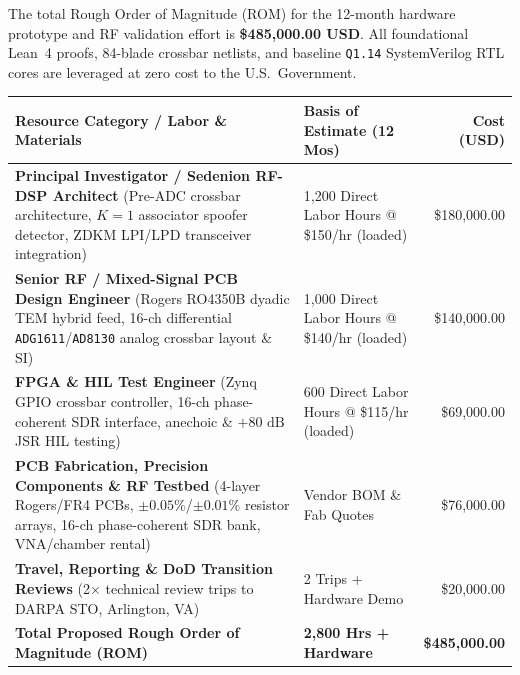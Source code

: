 \documentclass[12pt,letterpaper]{article}
\begin{document}
The total Rough Order of Magnitude (ROM) for the 12-month hardware prototype and RF validation effort is \textbf{\$485,000.00 USD}. All foundational Lean~4 proofs, 84-blade crossbar netlists, and baseline \texttt{Q1.14} SystemVerilog RTL cores are leveraged at zero cost to the U.S.\ Government.

\vspace{4pt}
\begin{tabular}{@{}p{2.9in}p{1.75in}r@{}}
\toprule
\textbf{Resource Category / Labor \& Materials} & \textbf{Basis of Estimate (12 Mos)} & \textbf{Cost (USD)} \\
\midrule
\textbf{Principal Investigator / Sedenion RF-DSP Architect} \newline (Pre-ADC crossbar architecture, $K=1$ associator spoofer detector, ZDKM LPI/LPD transceiver integration) & 1,200 Direct Labor Hours @ \$150/hr (loaded) & \$180,000.00 \\
\addlinespace[3pt]
\textbf{Senior RF / Mixed-Signal PCB Design Engineer} \newline (Rogers RO4350B dyadic TEM hybrid feed, 16-ch differential \texttt{ADG1611}/\texttt{AD8130} analog crossbar layout \& SI) & 1,000 Direct Labor Hours @ \$140/hr (loaded) & \$140,000.00 \\
\addlinespace[3pt]
\textbf{FPGA \& HIL Test Engineer} \newline (Zynq GPIO crossbar controller, 16-ch phase-coherent SDR interface, anechoic \& $+80\text{ dB}$ JSR HIL testing) & 600 Direct Labor Hours @ \$115/hr (loaded) & \$69,000.00 \\
\addlinespace[3pt]
\textbf{PCB Fabrication, Precision Components \& RF Testbed} \newline (4-layer Rogers/FR4 PCBs, $\pm 0.05\%$/$\pm 0.01\%$ resistor arrays, 16-ch phase-coherent SDR bank, VNA/chamber rental) & Vendor BOM \& Fab Quotes & \$76,000.00 \\
\addlinespace[3pt]
\textbf{Travel, Reporting \& DoD Transition Reviews} \newline (2$\times$ technical review trips to DARPA STO, Arlington, VA) & 2 Trips + Hardware Demo & \$20,000.00 \\
\midrule
\textbf{Total Proposed Rough Order of Magnitude (ROM)} & \textbf{2,800 Hrs + Hardware} & \textbf{\$485,000.00} \\
\bottomrule
\end{tabular}
\end{document}
